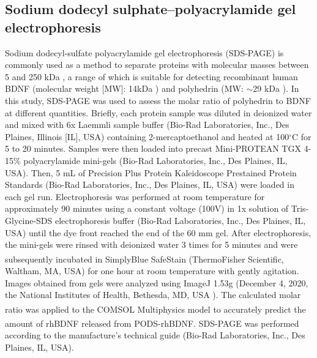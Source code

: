 \documentclass[review]{elsarticle}
\begin{document}
\subsection{Sodium dodecyl sulphate–polyacrylamide gel electrophoresis} 
Sodium dodecyl-sulfate polyacrylamide gel electrophoresis (SDS-PAGE) is commonly used as a method to separate proteins with molecular masses between 5 and 250 kDa  \cite{Laemmli1970}, a range of which is suitable for detecting recombinant human BDNF (molecular weight [MW]: 14kDa \cite {Mandel2009}) and polyhedrin (MW: $\sim$29 kDa \cite{Guo2017}). In this study, SDS-PAGE was used to assess the molar ratio of polyhedrin to BDNF at different quantities.  Briefly, each protein sample was diluted in deionized water and mixed with 6x Laemmli sample buffer (Bio-Rad Laboratories, Inc., Des Plaines, Illinois [IL], USA) containing 2-mercaptoethanol and heated at 100$^\circ$C for 5 to 20 minutes. Samples were then loaded into precast Mini-PROTEAN TGX 4-15\% polyacrylamide mini-gels (Bio-Rad Laboratories, Inc., Des Plaines, IL, USA). Then, 5 mL of Precision Plus Protein Kaleidoscope Prestained Protein Standards (Bio-Rad Laboratories, Inc., Des Plaines, IL, USA) were loaded in each gel run. Electrophoresis was performed at room temperature for approximately 90 minutes using a constant voltage (100V) in 1x solution of Tris-Glycine-SDS electrophoresis buffer (Bio-Rad Laboratories, Inc., Des Plaines, IL, USA) until the dye front reached the end of the 60 mm gel. After electrophoresis, the mini-gels were rinsed with deionized water 3 times for 5 minutes and were subsequently incubated in SimplyBlue\textsuperscript{\texttrademark} SafeStain (ThermoFisher Scientific, Waltham, MA, USA) for one hour at room temperature with gently agitation. Images obtained from gels were analyzed using ImageJ 1.53g (December 4, 2020, the National Institutes of Health, Bethesda, MD, USA \cite{Schneider2012}). The calculated molar ratio was applied to the COMSOL\textsuperscript{\textregistered} Multiphysics model to accurately predict the amount of rhBDNF released from PODS\textsuperscript{\textregistered}-rhBDNF. SDS-PAGE was performed according to the manufacture's technical guide (Bio-Rad Laboratories, Inc., Des Plaines, IL, USA). 
\end{document}
